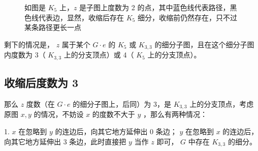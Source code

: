 \documentclass[11pt, a4paper]{ctexart}
\begin{document}
\begin{figure}[H]
    \caption{如图是 $K_5$ 上，$z$ 是子图上度数为 2 的点，其中蓝色线代表路径，黑色线代表边，显然，收缩后存在 $K_5$ 细分，收缩前仍然存在，只不过某条路径更长一点}
\end{figure}

剩下的情况是， $z$ 属于某个 $G\cdot e$ 的 $K_{5}$ 或 $K_{3,3}$ 的细分子图，且在这个细分子图内度数为 3（ $K_{3,3}$ 上的分支顶点）或 4（ $K_5$ 上的分支顶点）。

\subsection{收缩后度数为 3}
那么 $z$ 度数（在 $G\cdot e$ 的细分子图上，后同）为 3，是 $K_{3,3}$ 上的分支顶点，考虑原图 $x,y$ 的情况，不妨设 $x$ 的度数不大于 $y$ ，那么有两种情况：

1. $x$ 在忽略到 $y$ 的连边后，向其它地方延伸出 0 条边； $y$ 在忽略到 $x$ 的连边后，向其它地方延伸出 3 条边，此时直接把 $y$ 当作 $z$ 即可， $G$ 中存在 $K_{3,3}$ 的细分。
\end{document}
